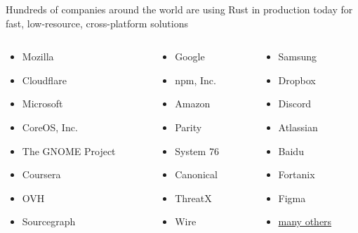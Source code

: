 \begin{frame}{\insertsubsection}

  Hundreds of companies around the world are using Rust in production today for
  fast, low-resource, cross-platform solutions

  \begin{columns}
    \begin{column}{.33\textwidth}
      \begin{itemize}
      \item Mozilla
      \item Cloudflare
      \item Microsoft
      \item CoreOS, Inc.
      \item The GNOME Project
      \item Coursera
      \item OVH
      \item Sourcegraph
      \end{itemize}
    \end{column}
    \begin{column}{.33\textwidth}
      \begin{itemize}
      \item Google
      \item npm, Inc.
      \item Amazon
      \item Parity
      \item System 76
      \item Canonical
      \item ThreatX
      \item Wire
      \end{itemize}
    \end{column}
    \begin{column}{.33\textwidth}
      \begin{itemize}
      \item Samsung
      \item Dropbox
      \item Discord
      \item Atlassian
      \item Baidu
      \item Fortanix
      \item Figma
      \item \href{https://www.rust-lang.org/production/users}{many others}
      \end{itemize}
    \end{column}
  \end{columns}


\end{frame}
